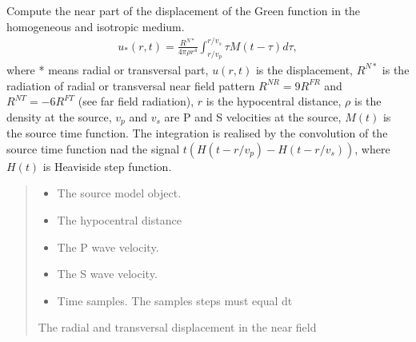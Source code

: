\documentclass[letterpaper,10pt,english]{sphinxmanual}
\begin{document}
\begin{fulllineitems}
\begin{fulllineitems}
\label{\detokenize{api_lib:green_functions.HomogeneousGreenFunction.near}}
\pysigstartsignatures
{}
\pysigstopsignatures
\sphinxAtStartPar
Compute the near part of the displacement
of the Green function in the homogeneous and isotropic medium.
\begin{equation*}
\begin{split}u_* \left(r, t \right) = \frac{R^{N*}}{4\pi\rho r^4}\int_{r/v_p}^{r/v_s}\tau M\left( t-\tau \right)d\tau,\end{split}
\end{equation*}
\sphinxAtStartPar
where * means radial or transversal part, \(u \left(r, t \right)\) is the displacement,
\(R^{N*}\) is the radiation of radial or transversal near field pattern
\(R^{NR}= 9R^{FR}\) and \(R^{NT}= -6R^{FT}\) (see far field radiation),
\(r\) is the hypocentral distance, \(\rho\) is the density at the source,
\(v_p\) and \(v_s\) are P and S velocities at the source,
\(M\left( t \right)\) is the source time function.
The integration is realised by the convolution of the source time function nad the signal
\(t(H(t-r/v_p) - H(t-r/v_s))\), where \(H(t)\) is Heaviside step function.
\begin{quote}\begin{description}
\begin{itemize}
\item {} 
\sphinxAtStartPar
{} \textendash{} The source model object.

\item {} 
\sphinxAtStartPar
{} \textendash{} The hypocentral distance

\item {} 
\sphinxAtStartPar
{} \textendash{} The P wave velocity.

\item {} 
\sphinxAtStartPar
{} \textendash{} The S wave velocity.

\item {} 
\sphinxAtStartPar
{} \textendash{} Time samples. The samples steps must equal dt

\end{itemize}

\sphinxAtStartPar
The radial and transversal displacement in the near field

\end{description}\end{quote}

\end{fulllineitems}


\end{fulllineitems}
\end{document}
